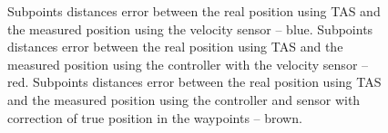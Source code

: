 \documentclass{article}
\begin{document}
\begin{figure}[ht]
    \centering
    \caption{Subpoints distances error between the real position using TAS and the measured position using the velocity sensor -- blue. Subpoints distances error between the real position using TAS and the measured position using the controller with the velocity sensor -- red. Subpoints distances error between the real position using TAS and the measured position using the controller and sensor with correction of true position in the waypoints -- brown.}
    \label{fig:error_all}
\end{figure}
\end{document}
